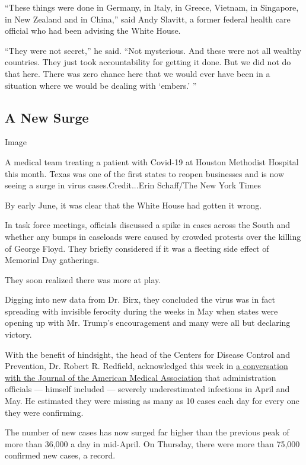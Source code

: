 ``These things were done in Germany, in Italy, in Greece, Vietnam, in
Singapore, in New Zealand and in China,'' said Andy Slavitt, a former
federal health care official who had been advising the White House.

``They were not secret,'' he said. ``Not mysterious. And these were not
all wealthy countries. They just took accountability for getting it
done. But we did not do that here. There was zero chance here that we
would ever have been in a situation where we would be dealing with
`embers.' ''

\hypertarget{a-new-surge}{%
\subsection{A New Surge}\label{a-new-surge}}

Image

A medical team treating a patient with Covid-19 at Houston Methodist
Hospital this month. Texas was one of the first states to reopen
businesses and is now seeing a surge in virus cases.Credit...Erin
Schaff/The New York Times

By early June, it was clear that the White House had gotten it wrong.

In task force meetings, officials discussed a spike in cases across the
South and whether any bumps in caseloads were caused by crowded protests
over the killing of George Floyd. They briefly considered if it was a
fleeting side effect of Memorial Day gatherings.

They soon realized there was more at play.

Digging into new data from Dr. Birx, they concluded the virus was in
fact spreading with invisible ferocity during the weeks in May when
states were opening up with Mr. Trump's encouragement and many were all
but declaring victory.

With the benefit of hindsight, the head of the Centers for Disease
Control and Prevention, Dr. Robert R. Redfield, acknowledged this week
in
\href{https://jamanetwork.com/journals/jama/pages/conversations-with-dr-bauchner}{a
conversation with the Journal of the American Medical Association} that
administration officials --- himself included --- severely
underestimated infections in April and May. He estimated they were
missing as many as 10 cases each day for every one they were confirming.

The number of new cases has now surged far higher than the previous peak
of more than 36,000 a day in mid-April. On Thursday, there were more
than 75,000 confirmed new cases, a record.

